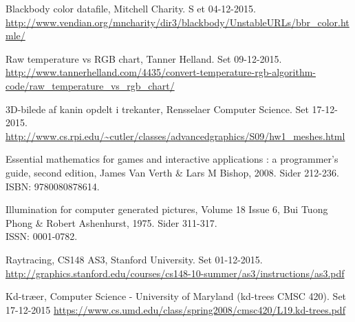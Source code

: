 \begin{thebibliography}{99}
  Blackbody color datafile, 
  Mitchell Charity. S
  et 04-12-2015.\\
  \url{http://www.vendian.org/mncharity/dir3/blackbody/UnstableURLs/bbr_color.htmle/}
  
  Raw temperature vs RGB chart,
  Tanner Helland. 
  Set 09-12-2015.\\
  \url{http://www.tannerhelland.com/4435/convert-temperature-rgb-algorithm-code/raw_temperature_vs_rgb_chart/}
  
  3D-bilede af kanin opdelt i trekanter,
  Rensselaer Computer Science.
  Set 17-12-2015.\\
  \url{http://www.cs.rpi.edu/~cutler/classes/advancedgraphics/S09/hw1_meshes.html}

  Essential mathematics for games and interactive applications : a programmer's guide, second edition, James Van Verth \& Lars M   Bishop, 2008. Sider 212-236.\\
  ISBN: 9780080878614.
  
  Illumination for computer generated pictures, Volume 18 Issue 6, Bui Tuong Phong \& Robert Ashenhurst, 1975. Sider 311-317. \\
  ISSN: 0001-0782.

  Raytracing, 
  CS148 AS3, Stanford University. 
  Set 01-12-2015.\\
  \url{http://graphics.stanford.edu/courses/cs148-10-summer/as3/instructions/as3.pdf}
  

  Kd-træer,
  Computer Science - University of Maryland (kd-trees CMSC 420).
  Set 17-12-2015
  \url{https://www.cs.umd.edu/class/spring2008/cmsc420/L19.kd-trees.pdf}
  
\end{thebibliography}
\clearpage